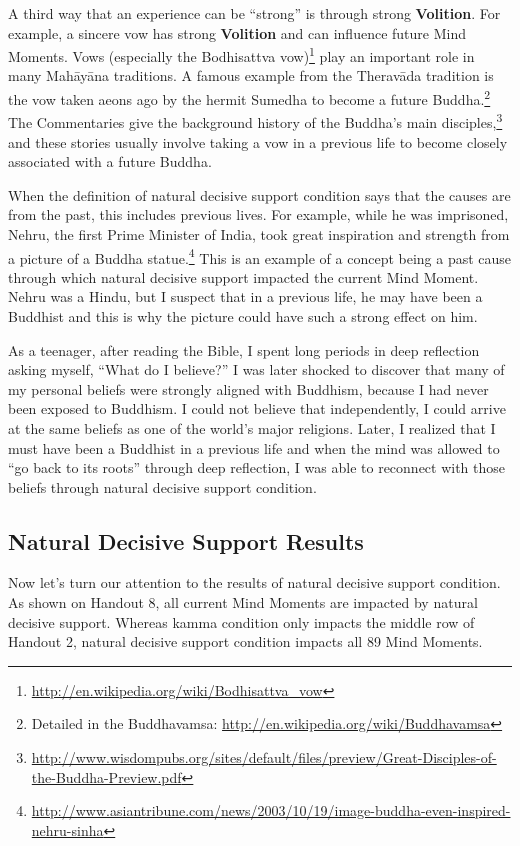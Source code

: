 A third way that an experience can be “strong” is through strong \textbf{Volition}. For example, a sincere vow has strong \textbf{Volition} and can influence future Mind Moments. Vows (especially the Bodhisattva vow)\footnote{\url{http://en.wikipedia.org/wiki/Bodhisattva_vow}} play an important role in many Mahāyāna traditions. A famous example from the Theravāda tradition is the vow taken aeons ago by the hermit Sumedha to become a future Buddha.\footnote{Detailed in the Buddhavamsa: \url{http://en.wikipedia.org/wiki/Buddhavamsa}} The Commentaries give the background history of the Buddha’s main disciples,\footnote{\url{http://www.wisdompubs.org/sites/default/files/preview/Great-Disciples-of-the-Buddha-Preview.pdf}} and these stories usually involve taking a vow in a previous life to become closely associated with a future Buddha.

When the definition of natural decisive support condition says that the causes are from the past, this includes previous lives. For example, while he was imprisoned, Nehru, the first Prime Minister of India, took great inspiration and strength from a picture of a Buddha statue.\footnote{\url{http://www.asiantribune.com/news/2003/10/19/image-buddha-even-inspired-nehru-sinha}} This is an example of a concept being a past cause through which natural decisive support impacted the current Mind Moment. Nehru was a Hindu, but I suspect that in a previous life, he may have been a Buddhist and this is why the picture could have such a strong effect on him. 

As a teenager, after reading the Bible, I spent long periods in deep reflection asking myself, “What do I believe?” I was later shocked to discover that many of my personal beliefs were strongly aligned with Buddhism, because I had never been exposed to Buddhism. I could not believe that independently, I could arrive at the same beliefs as one of the world’s major religions. Later, I realized that I must have been a Buddhist in a previous life and when the mind was allowed to “go back to its roots” through deep reflection, I was able to reconnect with those beliefs through natural decisive support condition.

\subsection*{Natural Decisive Support Results}

Now let’s turn our attention to the results of natural decisive support condition. As shown on Handout 8, all current Mind Moments are impacted by natural decisive support. Whereas kamma condition only impacts the middle row of Handout 2, natural decisive support condition impacts all 89 Mind Moments.


